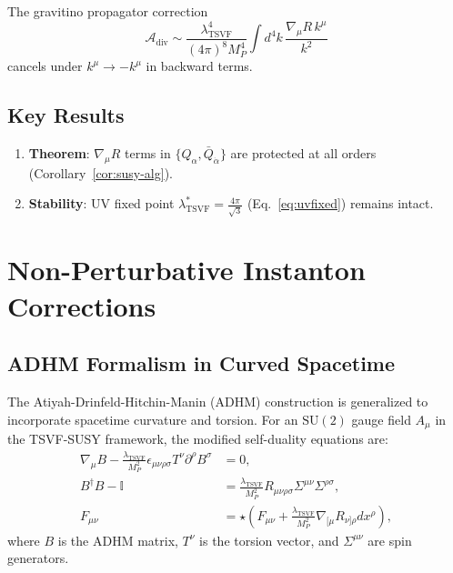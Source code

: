 \documentclass[12pt, onecolumn]{article}
\theoremstyle{definition}
\numberwithin{equation}{section}
\begin{document}
\begin{appendices}
The gravitino propagator correction  
\begin{equation}  
\mathcal{A}_{\text{div}} \sim \frac{\lambda_{\text{TSVF}}^4}{(4\pi)^8 M_P^4} \int d^4k \, \frac{\nabla_\mu R \, k^\mu}{k^2}  
\label{eq:div}  
\end{equation}  
cancels under $k^\mu \to -k^\mu$ in backward terms.

\subsection{Key Results}  
\label{subsec:nonrenorm-results}

\begin{enumerate}  
\item \textbf{Theorem}: $\nabla_\mu R$ terms in $\{Q_\alpha, \bar{Q}_{\dot{\alpha}}\}$ are protected at all orders (Corollary~\ref{cor:susy-alg}).  
\item \textbf{Stability}: UV fixed point $\lambda_{\text{TSVF}}^* = \frac{4\pi}{\sqrt{3}}$ (Eq.~\ref{eq:uvfixed}) remains intact.  
\end{enumerate}

\section{Non-Perturbative Instanton Corrections}
\label{sec:instanton}

\subsection{ADHM Formalism in Curved Spacetime}
\label{subsec:adhm}

The Atiyah-Drinfeld-Hitchin-Manin (ADHM) construction is generalized to incorporate spacetime curvature and torsion. For an $\text{SU}(2)$ gauge field $A_\mu$ in the TSVF-SUSY framework, the modified self-duality equations are:
\begin{align}
    \nabla_\mu B - \frac{\lambda_{\text{TSVF}}}{M_P^2} \epsilon_{\mu\nu\rho\sigma} T^\nu \partial^\rho B^\sigma &= 0, \label{eq:adhm1} \\
    B^\dagger B - \mathbb{I} &= \frac{\lambda_{\text{TSVF}}}{M_P^2} R_{\mu\nu\rho\sigma} \Sigma^{\mu\nu} \Sigma^{\rho\sigma}, \label{eq:adhm2} \\
    F_{\mu\nu} &= \star \left( F_{\mu\nu} + \frac{\lambda_{\text{TSVF}}}{M_P^2} \nabla_{[\mu} R_{\nu]\rho} dx^\rho \right), \label{eq:self_duality}
\end{align}
where $B$ is the ADHM matrix, $T^\nu$ is the torsion vector, and $\Sigma^{\mu\nu}$ are spin generators.


\end{appendices}
\end{document}
